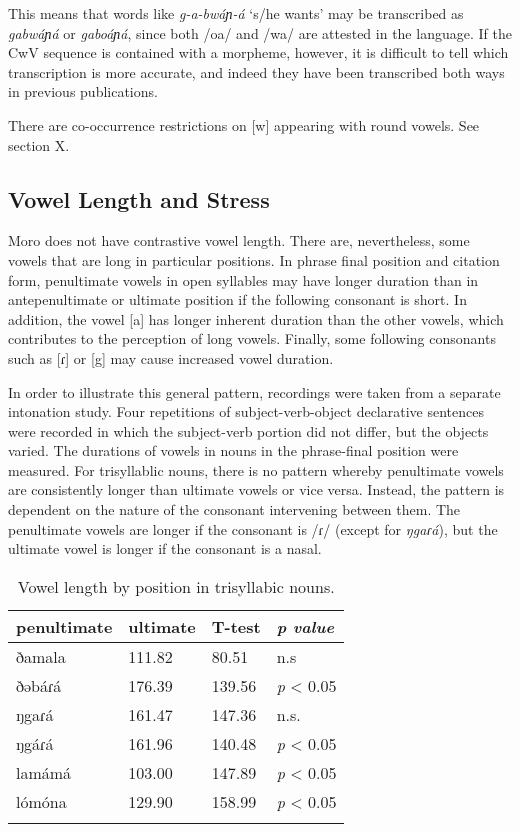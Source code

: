 
This means that words like \textit{g-a-bwáɲ-á} ‘s/he wants’ may be transcribed as \textit{gabwáɲá} or \textit{gaboáɲá}, since both /oa/ and /wa/ are attested in the language. If the CwV sequence is contained with a morpheme, however, it is difficult to tell which transcription is more accurate, and indeed they have been transcribed both ways in previous publications.


There are co-occurrence restrictions on [w] appearing with round vowels.  See section X. 

\subsection{Vowel Length and Stress}
Moro does not have contrastive vowel length. There are, nevertheless, some vowels that are long in particular positions. In phrase final position and citation form, penultimate vowels in open syllables may have longer duration than in antepenultimate or ultimate position if the following consonant is short. In addition, the vowel [a] has longer inherent duration than the other vowels, which contributes to the perception of long vowels. Finally, some following consonants such as [ɾ] or [g] may cause increased vowel duration. 

In order to illustrate this general pattern, recordings were taken from a separate intonation study. Four repetitions of subject-verb-object declarative sentences were recorded in which the subject-verb portion did not differ, but the objects varied. The durations of vowels in nouns in the phrase-final position were measured. For trisyllablic nouns, there is no pattern whereby penultimate vowels are consistently longer than ultimate vowels or vice versa. Instead, the pattern is dependent on the nature of the consonant intervening between them. The penultimate vowels are longer if the consonant is /ɾ/ (except for \textit{ŋgaɾá}), but the ultimate vowel is longer if the consonant is a nasal. 

\begin{table}
  \begin{tabular}{llll}
    \lsptoprule
	penultimate	&	ultimate	&	T-test & 
\textit{p value}	\\
\midrule 
ðamala	&	111.82	&	80.51	&	n.s			\\
ðəbáɾá	&	176.39	&	139.56	&	\textit{p} < 0.05	\\
ŋgaɾá	&	161.47	&	147.36	&	n.s.		\\
ŋgáɾá	&	161.96	&	140.48	&	\textit{p} < 0.05	\\	
lamámá	&	103.00	&	147.89	&	\textit{p} < 0.05	\\
lómóna	&	129.90	&	158.99	&	\textit{p} < 0.05	\\
\lspbottomrule
  \end{tabular}
  \caption{Vowel length by position in trisyllabic nouns.}
  \label{tab:ch2:X}
\end{table}


